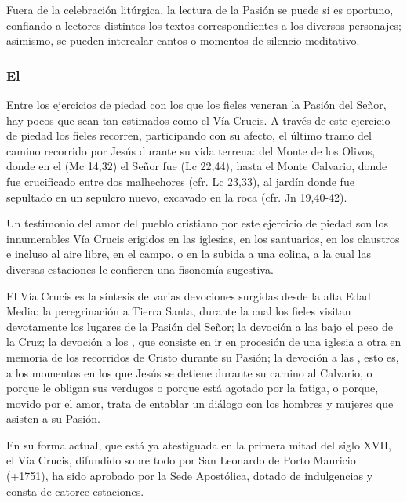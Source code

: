\begin{introstyle}
Fuera de la celebración litúrgica, la lectura de la Pasión se puede  si es oportuno, confiando a lectores distintos los textos correspondientes a los diversos personajes; asimismo, se pueden intercalar cantos o momentos de silencio meditativo.

\subsubsection{El }

Entre los ejercicios de piedad con los que los fieles veneran la Pasión del Señor, hay pocos que sean tan estimados como el Vía Crucis. A través de este ejercicio de piedad los fieles recorren, participando con su afecto, el último tramo del camino recorrido por Jesús durante su vida terrena: del Monte de los Olivos, donde en el  (Mc 14,32) el Señor fue  (Lc 22,44), hasta el Monte Calvario, donde fue crucificado entre dos malhechores (cfr. Lc 23,33), al jardín donde fue sepultado en un sepulcro nuevo, excavado en la roca (cfr. Jn 19,40-42).

Un testimonio del amor del pueblo cristiano por este ejercicio de piedad son los innumerables Vía Crucis erigidos en las iglesias, en los santuarios, en los claustros e incluso al aire libre, en el campo, o en la subida a una colina, a la cual las diversas estaciones le confieren una fisonomía sugestiva.

El Vía Crucis es la síntesis de varias devociones surgidas desde la alta Edad Media: la peregrinación a Tierra Santa, durante la cual los fieles visitan devotamente los lugares de la Pasión del Señor; la devoción a las  bajo el peso de la Cruz; la devoción a los , que consiste en ir en procesión de una iglesia a otra en memoria de los recorridos de Cristo durante su Pasión; la devoción a las , esto es, a los momentos en los que Jesús se detiene durante su camino al Calvario, o porque le obligan sus verdugos o porque está agotado por la fatiga, o porque, movido por el amor, trata de entablar un diálogo con los hombres y mujeres que asisten a su Pasión.

En su forma actual, que está ya atestiguada en la primera mitad del siglo XVII, el Vía Crucis, difundido sobre todo por San Leonardo de Porto Mauricio (+1751), ha sido aprobado por la Sede Apostólica, dotado de indulgencias y consta de catorce estaciones.


\end{introstyle}
